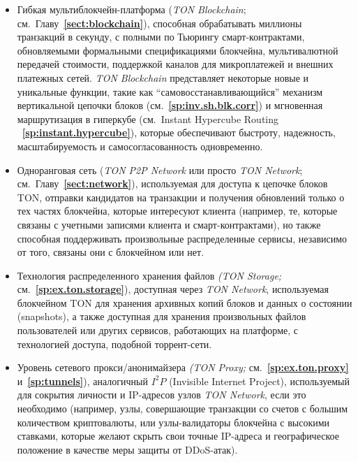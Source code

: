 \documentclass[12pt,oneside]{article}
\def\refpoint#1{{\rm\textbf{\ref{#1}}}}
\let\ptref=\refpoint
\begin{document}
\begin{Russian}
    \begin{itemize}
    \item Гибкая мультиблокчейн-платформа ({\em TON Blockchain};
        см.\ Главу~\ptref{sect:blockchain}), способная обрабатывать
        миллионы транзакций в секунду, с полными по Тьюрингу
        смарт-контрактами, обновляемыми формальными спецификациями
        блокчейна, мультивалютной передачей стоимости, поддержкой каналов
        для микроплатежей и внешних платежных сетей. {\em TON Blockchain\/}
        представляет некоторые новые и уникальные функции, такие как
        ``самовосстанавливающийся'' механизм вертикальной цепочки блоков
        (см.~\ptref{sp:inv.sh.blk.corr}) и мгновенная маршрутизация в
        гиперкубе (см.\ Instant Hypercube Routing ~\ptref{sp:instant.hypercube}),
        которые обеспечивают быстроту, надежность, масштабируемость и
        самосогласованность одновременно.
    \item Одноранговая сеть ({\em TON P2P Network} или просто {\em TON Network};
        см.\ Главу~\ptref{sect:network}), используемая для доступа к цепочке блоков TON,
        отправки кандидатов на транзакции и получения обновлений только о тех частях
        блокчейна, которые интересуют клиента (например, те, которые связаны с
        учетными записями клиента и смарт-контрактами), но также способная поддерживать
        произвольные распределенные сервисы, независимо от того, связаны они с
        блокчейном или нет.
    \item Технология распределенного хранения файлов {\em (TON Storage;}
        см.~\ptref{sp:ex.ton.storage}), доступная через {\em TON Network},
        используемая блокчейном TON для хранения архивных копий блоков и
        данных о состоянии (snapshots), а также доступная для хранения
        произвольных файлов пользователей или других сервисов, работающих
        на платформе, с технологией доступа, подобной торрент-сети.
    \item  Уровень сетевого прокси/анонимайзера {\em (TON Proxy;}
        см.~\ptref{sp:ex.ton.proxy} и~\ptref{sp:tunnels}), аналогичный
        $I^2P$ (Invisible Internet Project), используемый для сокрытия
        личности и IP-адресов узлов {\em TON Network\/}, если это
        необходимо (например, узлы, совершающие транзакции со счетов
        с большим количеством криптовалюты, или узлы-валидаторы блокчейна
        с высокими ставками, которые желают скрыть свои точные IP-адреса
        и географическое положение в качестве меры защиты от DDoS-атак).

\end{itemize}
\end{Russian}
\end{document}
